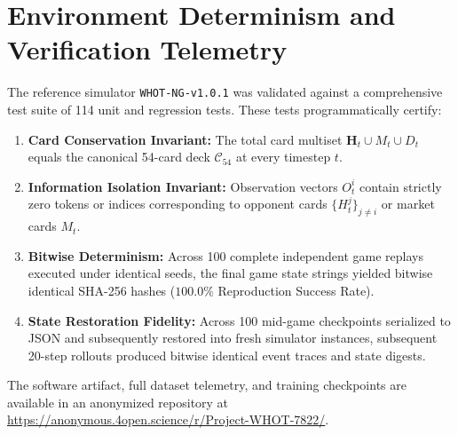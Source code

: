 \documentclass[journal]{IEEEtran}
\begin{document}
\section{Environment Determinism and Verification Telemetry}
\label{sec:supp_determinism}

The reference simulator \texttt{WHOT-NG-v1.0.1} was validated against a comprehensive test suite of 114 unit and regression tests. These tests programmatically certify:
\begin{enumerate}
\item \textbf{Card Conservation Invariant:} The total card multiset $\mathbf{H}_t \cup M_t \cup D_t$ equals the canonical 54-card deck $\mathcal{C}_{54}$ at every timestep $t$.
\item \textbf{Information Isolation Invariant:} Observation vectors $O_t^i$ contain strictly zero tokens or indices corresponding to opponent cards $\{H_t^j\}_{j \ne i}$ or market cards $M_t$.
\item \textbf{Bitwise Determinism:} Across 100 complete independent game replays executed under identical seeds, the final game state strings yielded bitwise identical SHA-256 hashes ($100.0\%$ Reproduction Success Rate).
\item \textbf{State Restoration Fidelity:} Across 100 mid-game checkpoints serialized to JSON and subsequently restored into fresh simulator instances, subsequent 20-step rollouts produced bitwise identical event traces and state digests.
\end{enumerate}

The software artifact, full dataset telemetry, and training checkpoints are available in an anonymized repository at \url{https://anonymous.4open.science/r/Project-WHOT-7822/}.



\end{document}
